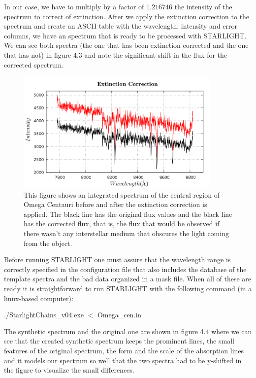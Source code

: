 In our case, we have to multiply by a factor of $1.216746$ the intensity of the spectrum to correct of extinction. After we apply the extinction correction to the spectrum and create an ASCII table with the wavelength, intensity and error columns, we have an spectrum that is ready to be processed with STARLIGHT. We can see both spectra (the one that has been extinction corrected and the one that has not) in figure 4.3 and note the significant shift in the flux for the corrected spectrum.

\begin{figure}[H]
\centering
\includegraphics[width=10cm]{images/extinction.png}
\caption[Extinction Correction]{This figure shows an integrated spectrum of the central region of Omega Centauri before and after the extinction correction is applied. The black line has the original flux values and the black line has the corrected flux, that is, the flux that would be observed if there wasn't any interstellar medium that obscures the light coming from the object.}
\end{figure}

Before running STARLIGHT one must assure that the wavelength range is correctly specified in the configuration file that also includes the database of the template spectra and the bad data organized in a mask file. When all of these are ready it is straightforward to run STARLIGHT with the following command (in a linux-based computer):

\begin{center}
./StarlightChains\_v04.exe $<$ Omega\_cen.in
\end{center}

The synthetic spectrum and the original one are shown in figure 4.4 where we can see that the created synthetic spectrum keeps the prominent lines, the small features of the original spectrum, the form and the scale of the absorption lines and it models our spectrum so well that the two spectra had to be y-shifted in the figure to visualize the small differences.

